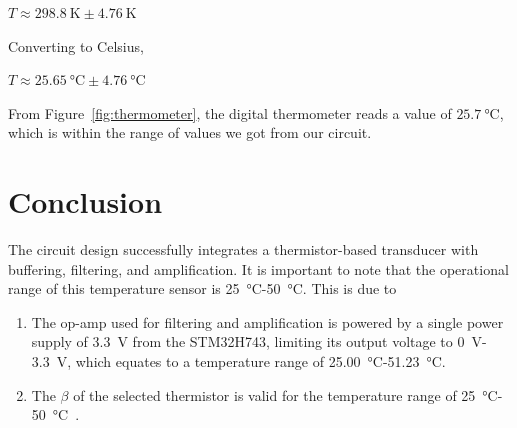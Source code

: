 \documentclass[12pt,a4paper]{article}
\begin{document}
$T \approx \SI{298.8}{\kelvin} \pm \SI{4.76}{\kelvin}$

Converting to Celsius,

$T \approx \SI{25.65}{\celsius} \pm \SI{4.76}{\celsius}$

From Figure~\ref{fig:thermometer}, the digital thermometer reads a value of $\SI{25.7}{\celsius}$, which is within the range of values we got from our circuit.
    
\section{Conclusion}
The circuit design successfully integrates a thermistor-based transducer with buffering, filtering, and amplification. It is important to note that the operational range of this temperature sensor is \SI{25}{\celsius}-\SI{50}{\celsius}. This is due to
\begin{enumerate}
    \item The op-amp used for filtering and amplification is powered by a single power supply of \SI{3.3}{\volt} from the STM32H743, limiting its output voltage to \SI{0}{\volt}-\SI{3.3}{\volt}, which equates to a temperature range of  \SI{25.00}{\celsius}-\SI{51.23}{\celsius}.
    \item The $\beta$ of the selected thermistor is valid for the temperature range of \SI{25}{\celsius}-\SI{50}{\celsius}~\cite{thermistor}.
\end{enumerate}

\newpage


\end{document}
